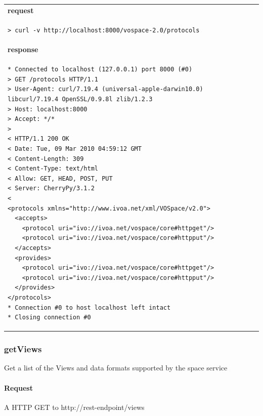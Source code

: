 \documentclass[11pt,a4paper]{ivoa}
\begin{document}
\begin{tabular}{ p{10cm} }
\\
\textbf{request} \\
\begin{lstlisting}
> curl -v http://localhost:8000/vospace-2.0/protocols
\end{lstlisting} \\
\textbf{response} \\
\begin{lstlisting}
* Connected to localhost (127.0.0.1) port 8000 (#0)
> GET /protocols HTTP/1.1
> User-Agent: curl/7.19.4 (universal-apple-darwin10.0) libcurl/7.19.4 OpenSSL/0.9.8l zlib/1.2.3
> Host: localhost:8000
> Accept: */*
> 
< HTTP/1.1 200 OK
< Date: Tue, 09 Mar 2010 04:59:12 GMT
< Content-Length: 309
< Content-Type: text/html
< Allow: GET, HEAD, POST, PUT
< Server: CherryPy/3.1.2
< 
<protocols xmlns="http://www.ivoa.net/xml/VOSpace/v2.0">
  <accepts>
    <protocol uri="ivo://ivoa.net/vospace/core#httpget"/>
    <protocol uri="ivo://ivoa.net/vospace/core#httpput"/>
  </accepts>
  <provides>
    <protocol uri="ivo://ivoa.net/vospace/core#httpget"/>
    <protocol uri="ivo://ivoa.net/vospace/core#httpput"/>
  </provides>
</protocols>
* Connection #0 to host localhost left intact
* Closing connection #0
\end{lstlisting}
\end{tabular}

\subsubsection{getViews}
Get a list of the Views and data formats supported by the space service

\paragraph{Request}
A HTTP GET to http://rest-endpoint/views
\end{document}
